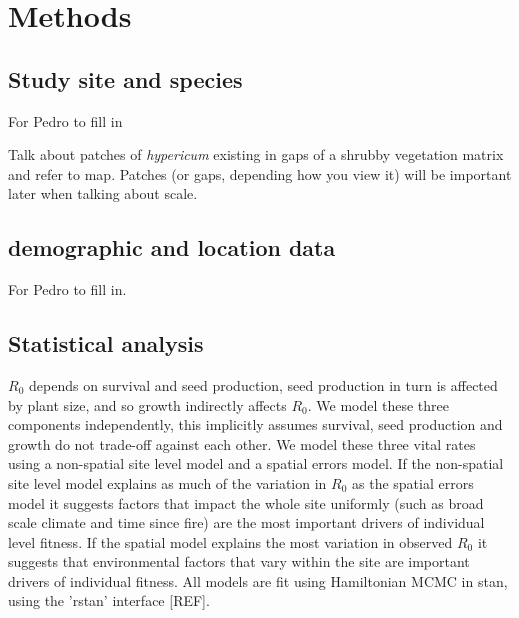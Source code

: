 \documentclass[12pt,a4paper]{article}
\begin{document}
\section*{Methods}
\subsection*{Study site and species}
For Pedro to fill in

Talk about patches of \textit{hypericum} existing in gaps of a shrubby vegetation matrix and refer to map. Patches (or gaps, depending how you view it) will be important later when talking about scale.

\subsection*{demographic and location data} 
For Pedro to fill in.

\subsection*{Statistical analysis}
$R_0$ depends on survival and seed production, seed production in turn is affected by plant size, and so growth indirectly affects $R_0$. We model these three components independently, this implicitly assumes survival, seed production and growth do not trade-off against each other. We model these three vital rates using a non-spatial site level model and a spatial errors model. If the non-spatial site level model explains as much of the variation in $R_0$ as the spatial errors model it suggests factors that impact the whole site uniformly (such as broad scale climate and time since fire) are the most important drivers of individual level fitness. If the spatial model explains the most variation in observed $R_0$ it suggests that environmental factors that vary within the site are important drivers of individual fitness. All models are fit using Hamiltonian MCMC in stan, using the 'rstan' interface [REF].   
\end{document}
